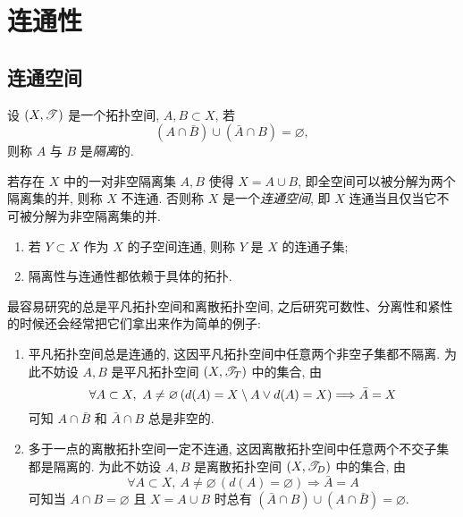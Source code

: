 
\section{连通性}

\subsection{连通空间}

    \begin{Definition}[隔离集]
        设 $ (X,\mathscr{T}) $ 是一个拓扑空间, $ A, B\subset X $, 若
        \[
            (A\cap\bar{B})\cup(\bar{A}\cap B)=\varnothing,
        \]
        则称 $ A $ 与 $ B $ 是\emph{隔离}的.
    \end{Definition}

    \begin{Definition}[连通空间]
        若存在 $ X $ 中的一对非空隔离集 $ A, B $ 使得 $ X=A\cup B $, 即全空间可以被分解为两个隔离集的并, 则称 $ X $ 不连通. 否则称 $ X $ 是一个\emph{连通空间}, 即 $ X $ 连通当且仅当它不可被分解为非空隔离集的并.
        \begin{enumerate}
            \item 若 $ Y\subset X $ 作为 $ X $ 的子空间连通, 则称 $ Y $ 是 $ X $ 的连通子集;
            \item 隔离性与连通性都依赖于具体的拓扑.
        \end{enumerate}
    \end{Definition}

    \begin{Example}
        最容易研究的总是平凡拓扑空间和离散拓扑空间, 之后研究可数性、分离性和紧性的时候还会经常把它们拿出来作为简单的例子:
        \begin{enumerate}
            \item 平凡拓扑空间总是连通的, 这因平凡拓扑空间中任意两个非空子集都不隔离. 为此不妨设 $ A, B $ 是平凡拓扑空间 $ (X,\mathscr{T}_T) $ 中的集合, 由
            \[
                \forall A\subset X,\ A\ne\varnothing\,(d(A)=X\sm A\lor d(A)=X)\Longrightarrow \bar{A}=X
            \]
            可知 $ A\cap\bar{B} $ 和 $ \bar{A}\cap B $ 总是非空的.
            \item 多于一点的离散拓扑空间一定不连通, 这因离散拓扑空间中任意两个不交子集都是隔离的. 为此不妨设 $ A, B $ 是离散拓扑空间 $ (X,\mathscr{T}_D) $ 中的集合, 由
            \[
                \forall A\subset X,\ A\ne\varnothing\,(d(A)=\varnothing)\Longrightarrow \bar{A}=A
            \]
            可知当 $ A\cap B=\varnothing $ 且 $ X=A\cup B $ 时总有 $ (\bar{A}\cap B)\cup(A\cap\bar{B})=\varnothing $.
        \end{enumerate}
    \end{Example}

